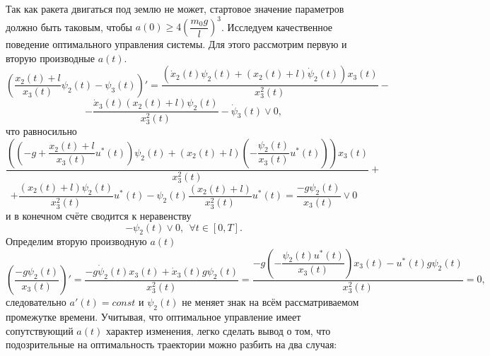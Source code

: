 \documentclass[a4paper,12pt]{article}
\begin{document}
\begin{itemize}
Так как ракета двигаться под землю не может, стартовое значение параметров должно быть таковым, чтобы $a(0) \geqslant 4 \left(\dfrac{m_0 g}{l} \right)^3 $. 
Исследуем качественное поведение оптимального управления системы. Для этого рассмотрим первую и вторую производные $a(t)$.
\[ \left(\dfrac{x_2(t) + l}{x_3(t)}\psi_2(t) - \psi_3(t) \right)' = \dfrac{\left(\dot{x}_2(t)\psi_2(t) + (x_2(t) + l)\dot{\psi}_2(t) \right) x_3(t)}{x_3^2(t)} - \] 
\[ - \dfrac{\dot{x}_3(t)(x_2(t) + l)\psi_2(t)}{x_3^2(t)} - \dot{\psi}_3(t) \vee 0, \]
что равносильно
\[\dfrac{\left( \left(-g + \dfrac{x_2(t) + l}{x_3(t)}u^*(t) \right)\psi_2(t) + \left(x_
2(t) + l\right)\left(- \dfrac{\psi_{2}(t)}{x_{3}(t)}u^*(t) \right) \right) x_3(t)}{x_3^2(t)} + \]
\[ + \dfrac{(x_2(t) + l)\psi_2(t)}{x_3^2(t)}u^*(t) - \psi_2(t) \dfrac{(x_2(t) + l)}{x_3^2(t)} u^*(t) = \dfrac{- g\psi_2(t)}{x_3(t)} \vee 0 \]
и в конечном счёте сводится к неравенству
\hypertarget{p16}{}
\begin{equation} \label{eq16}
- \psi_2(t) \vee 0,  \ \ \forall t \in [0, T]. 
\end{equation}
Определим вторую производную $a(t)$
\[ \left( \dfrac{- g\psi_2(t)}{x_3(t)} \right)' =  \dfrac{-g\dot{\psi}_2(t)x_3(t) + \dot{x}_3(t)g \psi_2(t)}{x_3^2(t)} = \dfrac{-g \left( - \dfrac{\psi_2(t)u^*(t)}{x_3(t)} \right)x_3(t) -u^*(t)g\psi_2(t)}{x_3^2(t)} = 0, \]
следовательно $a'(t) = const$ и $\psi_2(t)$ не меняет знак на всём рассматриваемом промежутке времени. Учитывая, что оптимальное управление имеет сопутствующий $a(t)$ характер изменения, легко сделать вывод о том, что подозрительные на оптимальность траектории можно разбить на два случая:


\end{itemize}
\end{document}
